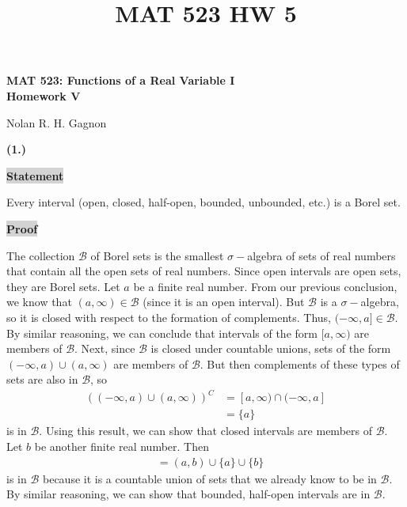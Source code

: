 \documentclass[12pt]{article}
\title{MAT 523 HW 5}
\newcommand{\mybox}{%
    \collectbox{%
        \setlength{\fboxsep}{2pt}%
        \fbox{\BOXCONTENT}%
    }%
}
\begin{document}
\begin{center}
\begin{large}
\textbf{MAT 523: Functions of a Real Variable I \\
Homework V \\}
\end{large}
Nolan R. H. Gagnon \\
\end{center}

\noindent \textbf{(1.)}

\vspace{3mm}

\noindent\mybox{\colorbox{lightgray}{\textbf{Statement}}}\hspace{3mm}\hrulefill

\noindent Every interval (open, closed, half-open, bounded, unbounded, etc.) is a Borel set.

\vspace{5mm}

\noindent\mybox{\colorbox{lightgray}{\textbf{Proof}}}\hspace{3mm}\hrulefill

The collection $\mathcal{B}$ of Borel sets is the smallest $\sigma-$algebra of sets of real numbers that contain all the open sets of real numbers. Since open intervals are open sets, they are Borel sets. Let $a$ be a finite real number. From our previous conclusion, we know that $(a,\infty)\in\mathcal{B}$ (since it is an open interval). But $\mathcal{B}$ is a $\sigma-$algebra, so it is closed with respect to the formation of complements. Thus, $(-\infty, a]\in\mathcal{B}.$ By similar reasoning, we can conclude that intervals of the form $[a, \infty)$ are members of $\mathcal{B}$. Next, since $\mathcal{B}$ is closed under countable unions, sets of the form $(-\infty,a)\cup(a,\infty)$ are members of $\mathcal{B}.$ But then complements of these types of sets are also in $\mathcal{B}$, so
\begin{align*}
    \left((-\infty,a)\cup(a,\infty)\right)^{C} &= [a,\infty)\cap(-\infty, a] \\
    &= \lbrace a \rbrace
\end{align*}
is in $\mathcal{B}.$ Using this result, we can show that closed intervals are members of $\mathcal{B}.$ Let $b$ be another finite real number. Then
\begin{align*}
    [a,b] &= (a,b)\cup\lbrace a \rbrace \cup \lbrace b \rbrace 
\end{align*}
is in $\mathcal{B}$ because it is a countable union of sets that we already know to be in $\mathcal{B}.$ By similar reasoning, we can show that bounded, half-open intervals are in $\mathcal{B}.$
\end{document}
